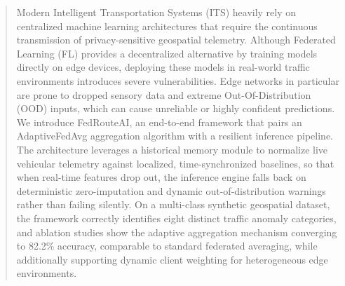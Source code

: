 \begin{abstract}
Modern Intelligent Transportation Systems (ITS) heavily rely on centralized machine learning architectures that require the continuous transmission of privacy-sensitive geospatial telemetry. Although Federated Learning (FL) provides a decentralized alternative by training models directly on edge devices, deploying these models in real-world traffic environments introduces severe vulnerabilities. Edge networks in particular are prone to dropped sensory data and extreme Out-Of-Distribution (OOD) inputs, which can cause unreliable or highly confident predictions. We introduce FedRouteAI, an end-to-end framework that pairs an AdaptiveFedAvg aggregation algorithm with a resilient inference pipeline. The architecture leverages a historical memory module to normalize live vehicular telemetry against localized, time-synchronized baselines, so that when real-time features drop out, the inference engine falls back on deterministic zero-imputation and dynamic out-of-distribution warnings rather than failing silently. On a multi-class synthetic geospatial dataset, the framework correctly identifies eight distinct traffic anomaly categories, and ablation studies show the adaptive aggregation mechanism converging to 82.2\% accuracy, comparable to standard federated averaging, while additionally supporting dynamic client weighting for heterogeneous edge environments.
\end{abstract}
